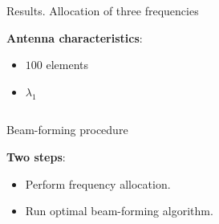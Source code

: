 \documentclass[../main.tex]{subfiles}
\begin{document}
\begin{frame}[t]{Results. Allocation of three frequencies}

\textbf{Antenna characteristics}:
\begin{itemize}
    \item $100$ elements
    \item $\lambda_1$ 
\end{itemize}

\begin{columns}[t]
        \begin{column}{0.55\textwidth}
            \centering
            \begin{adjustbox}{width=1\columnwidth}
            
            \end{adjustbox}
        \end{column}
        \begin{column}{0.55\textwidth}
            \centering
            \begin{adjustbox}{width=1\columnwidth}
            
            \end{adjustbox}
        \end{column}
\end{columns}   

\end{frame}



\begin{frame}[t]{Beam-forming procedure}
 
\textbf{Two steps}:
\begin{itemize}
    \item Perform frequency allocation.
    \item Run optimal beam-forming algorithm.
\end{itemize}



\end{frame}


%
%
\end{document}

